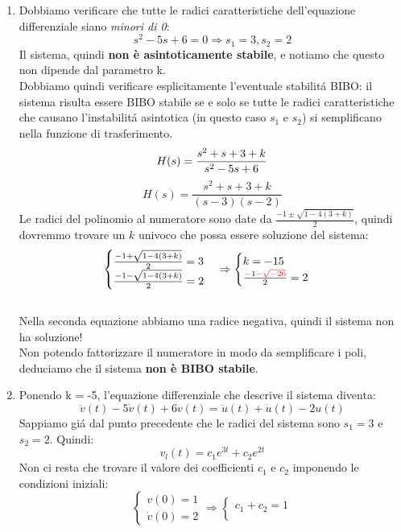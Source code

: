 \documentclass[12pt,a4paper]{article}
\begin{document}
	\begin{enumerate}
		\item Dobbiamo verificare che tutte le radici caratteristiche dell'equazione differenziale siano \textit{minori di 0}:
		\[
			s^2-5s+6=0
			\Rightarrow
			s_1 = 3, s_2 = 2
		\]
		Il sistema, quindi \textbf{non è asintoticamente stabile}, e notiamo che questo non dipende dal parametro k.\\
		Dobbiamo quindi verificare esplicitamente l'eventuale stabilit\'a BIBO: il sistema risulta essere BIBO stabile se e solo se tutte le radici caratteristiche che causano l'instabilit\'a asintotica (in questo caso $s_1$ e $s_2$) si semplificano nella funzione di trasferimento.
		\[
			H(s) = \frac{s^2 + s + 3 + k}{s^2 - 5s +6}\\
		\]
		\[
			H(s) = \frac{s^2 + s + 3 + k}{(s-3)(s-2)}
		\]
		Le radici del polinomio al numeratore sono date da $\frac{-1\pm\sqrt{1-4(3+k)}}{2}$, quindi dovremmo trovare un $k$ univoco che possa essere soluzione del sistema:\\
		\[
			\begin{cases}
				\frac{-1+\sqrt{1-4(3+k)}}{2} = 3\\
				\frac{-1-\sqrt{1-4(3+k)}}{2} = 2
			\end{cases}
			\Rightarrow
			\begin{cases}
				k = -15\\
				\frac{-1-\color{red}\sqrt{-26}\color{black}}{2} = 2
			\end{cases}
		\]
		\\Nella seconda equazione abbiamo una radice negativa, quindi il sistema non ha soluzione!\\
		Non potendo fattorizzare il numeratore in modo da semplificare i poli, deduciamo che il sistema \textbf{non è BIBO stabile}.
		\item Ponendo k = -5, l'equazione differenziale che descrive il sistema diventa:
		\[
			\ddot{v}(t) -5\dot{v}(t) + 6v(t) = \ddot{u}(t) + \dot{u}(t) -2u(t)
		\]
		Sappiamo gi\'a dal punto precedente che le radici del sistema sono $s_1 = 3$ e $s_2 = 2$. Quindi:
		\[
			v_l(t) = c_1e^{3t} + c_2e^{2t}
		\]
		Non ci resta che trovare il valore dei coefficienti $c_1$ e $c_2$ imponendo le condizioni iniziali:
		\[
			\begin{cases}
				v(0) = 1\\
				\dot{v}(0) = 2
			\end{cases}
			\Rightarrow
			\begin{cases}
				c_1 + c_2 = 1\\

\end{cases}\]
\end{enumerate}
\end{document}
